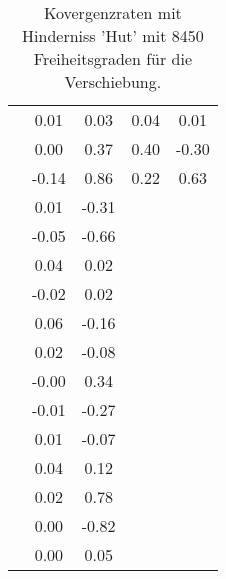 \begin{table}
\begin{tabular}{c|cc|cc|}
\multicolumn{1}{|c|}{} & \multicolumn{1}{|c|}{      0.01} & \multicolumn{1}{|c|}{      0.03} & \multicolumn{1}{|c|}{      0.04} & \multicolumn{1}{|c|}{      0.01} \\ 
\multicolumn{1}{|c|}{} & \multicolumn{1}{|c|}{      0.00} & \multicolumn{1}{|c|}{      0.37} & \multicolumn{1}{|c|}{      0.40} & \multicolumn{1}{|c|}{     -0.30} \\ 
\multicolumn{1}{|c|}{} & \multicolumn{1}{|c|}{     -0.14} & \multicolumn{1}{|c|}{      0.86} & \multicolumn{1}{|c|}{      0.22} & \multicolumn{1}{|c|}{      0.63} \\ 
\multicolumn{1}{|c|}{} & \multicolumn{1}{|c|}{      0.01} & \multicolumn{1}{|c|}{     -0.31} & \multicolumn{1}{|c|}{} & \multicolumn{1}{|c|}{} \\ 
\multicolumn{1}{|c|}{} & \multicolumn{1}{|c|}{     -0.05} & \multicolumn{1}{|c|}{     -0.66} & \multicolumn{1}{|c|}{} & \multicolumn{1}{|c|}{} \\ 
\multicolumn{1}{|c|}{} & \multicolumn{1}{|c|}{      0.04} & \multicolumn{1}{|c|}{      0.02} & \multicolumn{1}{|c|}{} & \multicolumn{1}{|c|}{} \\ 
\multicolumn{1}{|c|}{} & \multicolumn{1}{|c|}{     -0.02} & \multicolumn{1}{|c|}{      0.02} & \multicolumn{1}{|c|}{} & \multicolumn{1}{|c|}{} \\ 
\multicolumn{1}{|c|}{} & \multicolumn{1}{|c|}{      0.06} & \multicolumn{1}{|c|}{     -0.16} & \multicolumn{1}{|c|}{} & \multicolumn{1}{|c|}{} \\ 
\multicolumn{1}{|c|}{} & \multicolumn{1}{|c|}{      0.02} & \multicolumn{1}{|c|}{     -0.08} & \multicolumn{1}{|c|}{} & \multicolumn{1}{|c|}{} \\ 
\multicolumn{1}{|c|}{} & \multicolumn{1}{|c|}{     -0.00} & \multicolumn{1}{|c|}{      0.34} & \multicolumn{1}{|c|}{} & \multicolumn{1}{|c|}{} \\ 
\multicolumn{1}{|c|}{} & \multicolumn{1}{|c|}{     -0.01} & \multicolumn{1}{|c|}{     -0.27} & \multicolumn{1}{|c|}{} & \multicolumn{1}{|c|}{} \\ 
\multicolumn{1}{|c|}{} & \multicolumn{1}{|c|}{      0.01} & \multicolumn{1}{|c|}{     -0.07} & \multicolumn{1}{|c|}{} & \multicolumn{1}{|c|}{} \\ 
\multicolumn{1}{|c|}{} & \multicolumn{1}{|c|}{      0.04} & \multicolumn{1}{|c|}{      0.12} & \multicolumn{1}{|c|}{} & \multicolumn{1}{|c|}{} \\ 
\multicolumn{1}{|c|}{} & \multicolumn{1}{|c|}{      0.02} & \multicolumn{1}{|c|}{      0.78} & \multicolumn{1}{|c|}{} & \multicolumn{1}{|c|}{} \\ 
\multicolumn{1}{|c|}{} & \multicolumn{1}{|c|}{      0.00} & \multicolumn{1}{|c|}{     -0.82} & \multicolumn{1}{|c|}{} & \multicolumn{1}{|c|}{} \\ 
\multicolumn{1}{|c|}{} & \multicolumn{1}{|c|}{      0.00} & \multicolumn{1}{|c|}{      0.05} & \multicolumn{1}{|c|}{} & \multicolumn{1}{|c|}{} \\ 
\hline 
\end{tabular}\caption{Kovergenzraten mit Hinderniss 'Hut' mit 8450 Freiheitsgraden für die Verschiebung.}\label{tab:Rate_Hut_level5}
\end{table} 
